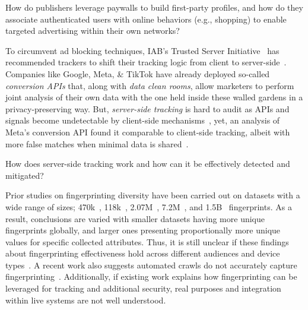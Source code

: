 \begin{opbox}
How do publishers leverage paywalls to build first-party profiles, and how do they associate authenticated users with online behaviors (e.g., shopping) to enable targeted advertising within their own networks?
\end{opbox}


%
To circumvent ad blocking techniques, IAB's Trusted Server Initiative~\cite{iabtechlabTechLabTrusted2025} has recommended trackers to shift their tracking logic from client to server-side~\cite{fisherImprovePerformanceSecurity2020}.
%
Companies like Google, Meta, \& TikTok have already deployed so-called \textit{conversion APIs} that, along with \textit{data clean rooms}, allow marketers to perform joint analysis of their own data with the one held inside these walled gardens in a privacy-preserving way.
%
But, \textit{server-side tracking} is hard to audit as APIs and signals become undetectable by client-side mechanisms~\cite{fouadDevilDetailsDetection2024}, yet, an analysis of Meta's conversion API found it comparable to client-side tracking, albeit with more false matches when minimal data is shared~\cite{fraihiClientsideServersideTracking2024}.
\begin{opbox}
How does server-side tracking work and how can it be effectively detected and mitigated?
\end{opbox}



Prior studies on fingerprinting diversity have been carried out on datasets with a wide range of sizes; 470k~\cite{eckersleyHowUniqueYour2010}, 118k~\cite{laperdrixBeautyBeastDiverting2016}, 2.07M~\cite{gomez-boixHidingCrowdAnalysis2018}, 7.2M~\cite{liWhoTouchedMy2020}, and 1.5B~\cite{wuHimManyFaces2023} fingerprints. As a result, conclusions are varied with smaller datasets having more unique fingerprints globally, and larger ones presenting proportionally more unique values for specific collected attributes. Thus, it is still unclear if these findings about fingerprinting effectiveness hold across different audiences and device types~\cite{berkeHowUniqueWhose2025}. A recent work also suggests automated crawls do not accurately capture fingerprinting~\cite{muthu2025beyond}. Additionally, if existing work explains how fingerprinting can be leveraged for tracking and additional security, real purposes and integration within live systems are not well understood.


